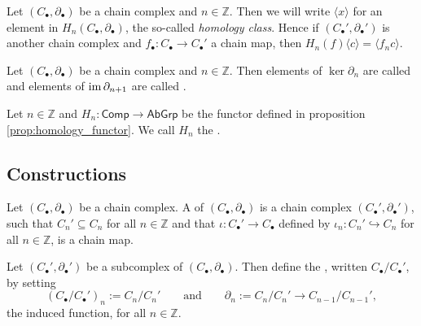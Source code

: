 \begin{remark}
	Let $(C_\bullet,\partial_\bullet)$ be a chain complex and $n \in \mathbb{Z}$. Then we will write $\langle x \rangle$ for an element in $H_n(C_\bullet,\partial_\bullet)$, the so-called \emph{homology class}. Hence if $(C_\bullet',\partial_\bullet')$ is another chain complex and $f_\bullet : C_\bullet \to C_\bullet'$ a chain map, then $H_n(f)\langle c \rangle = \langle f_nc\rangle$. 
\end{remark}

\begin{definition}
	Let $(C_\bullet,\partial_\bullet)$ be a chain complex and $n \in \mathbb{Z}$. Then elements of $\ker \partial_n$ are called  and elements of $\operatorname{im} \partial_{n + 1}$ are called .
\end{definition}

\begin{definition}
	Let $n \in \mathbb{Z}$ and $H_n : \mathsf{Comp} \to \mathsf{AbGrp}$ be the functor defined in proposition \ref{prop:homology_functor}. We call $H_n$ the .
\end{definition}

\subsection*{Constructions}

\begin{definition}[Subcomplex]
	Let $(C_\bullet,\partial_\bullet)$ be a chain complex. A  of $(C_\bullet,\partial_\bullet)$ is a chain complex $(C_\bullet',\partial_\bullet')$, such that $C_n' \subseteq C_n$ for all $n \in \mathbb{Z}$ and that $\iota : C_\bullet' \to C_\bullet$ defined by $\iota_n : C_n' \hookrightarrow C_n$ for all $n \in \mathbb{Z}$, is a chain map.
\end{definition}

\begin{definition}
	Let $(C_\bullet',\partial_\bullet')$ be a subcomplex of $(C_\bullet,\partial_\bullet)$. Then define the , written $C_\bullet/C_\bullet'$, by setting
	\begin{equation*}
		(C_\bullet/C_\bullet')_n := C_n/C_n' \qquad \text{and} \qquad \partial_n := C_n/C_n' \to C_{n - 1}/C_{n - 1}',
	\end{equation*}
	\noindent the induced function, for all $n \in \mathbb{Z}$.
\end{definition}
